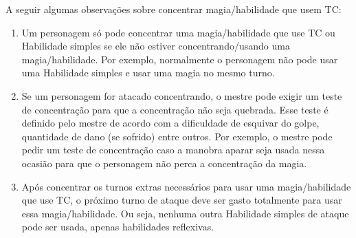 A seguir algumas observações sobre concentrar magia/habilidade que usem TC:
\begin{enumerate}

	\item Um personagem só pode concentrar uma magia/habilidade que use TC ou Habilidade simples se ele não estiver concentrando/usando uma magia/habilidade. Por exemplo, normalmente o personagem não pode usar uma Habilidade simples e usar uma magia no mesmo turno.

	

	\item Se um personagem for atacado concentrando, o mestre pode exigir um teste de concentração para que a concentração não seja quebrada. Esse teste é definido pelo mestre de acordo com a dificuldade de esquivar do golpe, quantidade de dano (se sofrido) entre outros. Por exemplo, o mestre pode pedir um teste de concentração caso a manobra aparar seja usada nessa ocasião para que o personagem não perca a concentração da magia.

	\item Após concentrar os turnos extras necessários para usar uma magia/habilidade que use TC, o próximo turno de ataque deve ser gasto totalmente para usar essa magia/habilidade. Ou seja, nenhuma outra Habilidade simples de ataque pode ser usada, apenas habilidades reflexivas.

\end{enumerate}


